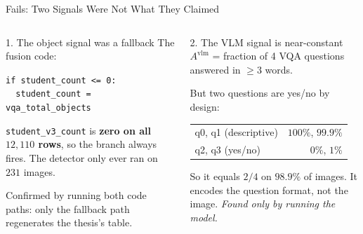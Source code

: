 \documentclass[aspectratio=169,11pt]{beamer}
\begin{document}
\begin{frame}{Fails: Two Signals Were Not What They Claimed}
\begin{columns}[T]
\begin{alertblock}{\small 1. The object signal was a fallback}
\footnotesize The fusion code:
\vspace{1mm}

{\tiny\texttt{if student\_count <= 0:}\\\texttt{\ \ student\_count = vqa\_total\_objects}}
\vspace{1mm}

\texttt{student\_v3\_count} is \textbf{zero on all $12{,}110$ rows}, so the branch always fires. The detector only ever ran on \textbf{$231$} images.
\vspace{1mm}

Confirmed by running both code paths: only the fallback path regenerates the thesis's table.
\end{alertblock}

\begin{alertblock}{\small 2. The VLM signal is near-constant}
\footnotesize $A^{\text{vlm}}$ = fraction of 4 VQA questions answered in $\ge 3$ words.
\vspace{1mm}

But two questions are yes/no by design:
\vspace{1mm}
\begin{center}
\begin{tabular}{@{}l r@{}}
q0, q1 (descriptive) & $100\%$, $99.9\%$ \\
q2, q3 (yes/no) & $0\%$, $1\%$ \\
\end{tabular}
\end{center}
\vspace{1mm}
So it equals $2/4$ on \textbf{$98.9\%$} of images. It encodes the question format, not the image. \emph{Found only by running the model.}
\end{alertblock}
\end{columns}
\end{frame}
\end{document}
